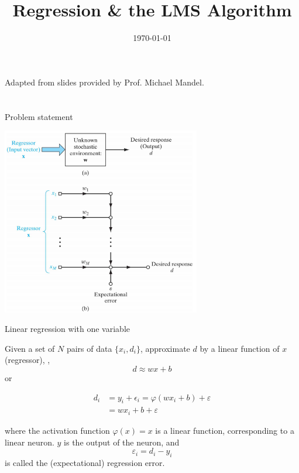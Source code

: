\documentclass[notes]{beamer}
\title[Opt for ML]{Regression \& the LMS Algorithm}
\date[\today]{\today}
\begin{document}



\begin{frame}
	\titlepage
	\begin{center}
		Adapted from slides provided by Prof.  Michael Mandel.		
	\end{center}

\end{frame}

\section{}\label{section}

\begin{frame}{Problem statement}

\centering 

\includegraphics[width=0.65000\textwidth]{2018-03-09-15-26-11.png} ~

\end{frame}

\begin{frame}{Linear regression with one variable}

Given a set of \(N\) pairs of data \(\{x_i,d_i\}\), approximate \(d\) by
a linear function of \(x\) (regressor), \ie, \[d \approx wx +b\] or

\begin{equation*}
\begin{aligned}
d_i &= y_i + \epsilon_i  = \varphi (wx_i + b ) + \varepsilon \\ 
 & = wx_i + b+\varepsilon 
\end{aligned}
\end{equation*}

where the activation function \(\varphi(x) = x\) is a linear function,
corresponding to a linear neuron. \(y\) is the output of the neuron, and
\[\varepsilon_i = d_i -y_i\] is called the (expectational) regression
error.

\end{frame}
\end{document}

